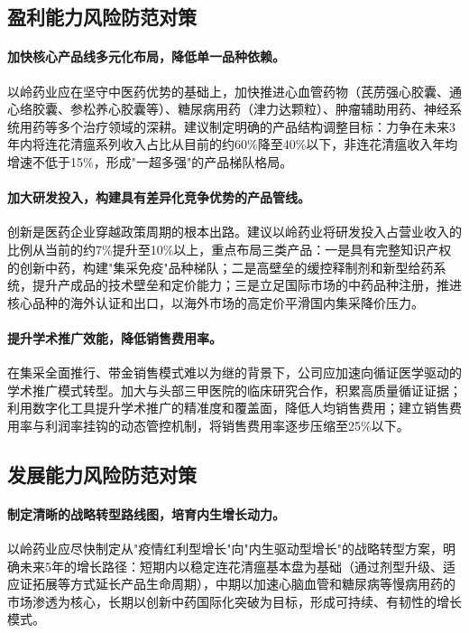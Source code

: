\documentclass[12pt,a4paper,fontset=windows,UTF8]{ctexart}
\begin{document}
\subsection{盈利能力风险防范对策}
\paragraph*{加快核心产品线多元化布局，降低单一品种依赖。}
以岭药业应在坚守中医药优势的基础上，加快推进心血管药物（芪苈强心胶囊、通心络胶囊、参松养心胶囊等）、糖尿病用药（津力达颗粒）、肿瘤辅助用药、神经系统用药等多个治疗领域的深耕。建议制定明确的产品结构调整目标：力争在未来3年内将连花清瘟系列收入占比从目前的约60\%降至40\%以下，非连花清瘟收入年均增速不低于15\%，形成"一超多强"的产品梯队格局。

\paragraph*{加大研发投入，构建具有差异化竞争优势的产品管线。}
创新是医药企业穿越政策周期的根本出路。建议以岭药业将研发投入占营业收入的比例从当前的约7\%提升至10\%以上，重点布局三类产品：一是具有完整知识产权的创新中药，构建"集采免疫"品种梯队；二是高壁垒的缓控释制剂和新型给药系统，提升产成品的技术壁垒和定价能力；三是立足国际市场的中药品种注册，推进核心品种的海外认证和出口，以海外市场的高定价平滑国内集采降价压力。

\paragraph*{提升学术推广效能，降低销售费用率。}
在集采全面推行、带金销售模式难以为继的背景下，公司应加速向循证医学驱动的学术推广模式转型。加大与头部三甲医院的临床研究合作，积累高质量循证证据；利用数字化工具提升学术推广的精准度和覆盖面，降低人均销售费用；建立销售费用率与利润率挂钩的动态管控机制，将销售费用率逐步压缩至25\%以下。

\subsection{发展能力风险防范对策}
\paragraph*{制定清晰的战略转型路线图，培育内生增长动力。}
以岭药业应尽快制定从"疫情红利型增长"向"内生驱动型增长"的战略转型方案，明确未来5年的增长路径：短期内以稳定连花清瘟基本盘为基础（通过剂型升级、适应证拓展等方式延长产品生命周期），中期以加速心脑血管和糖尿病等慢病用药的市场渗透为核心，长期以创新中药国际化突破为目标，形成可持续、有韧性的增长模式。
\end{document}
